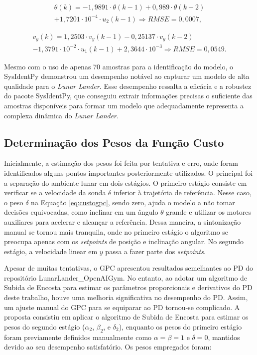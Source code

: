 \documentclass[12pt,           %
a4paper,                       %
openany,                       %
oneside,                       %
chapter=TITLE,                 %
english,                       %
spanish,                       %
brazil,                        %
sumario=tradicional]{abntex2}  %
\begin{document}
\begin{OnehalfSpace}
\begin{equation}
\begin{matrix}
    \theta(k) = -1,9891\cdot \theta(k-1) +0,989\cdot \theta(k-2)\\
    +1,7201\cdot 10^{-4}\cdot u_2(k-1)\Rightarrow RMSE=0,0007,
\end{matrix} 
\end{equation}

\begin{equation}
\begin{matrix}
    v_y(k) = 1,2503\cdot v_y(k-1) - 0,25137\cdot v_y(k-2)\\
    -1,3791\cdot 10^{-2}\cdot u_1(k-1)+2,3644\cdot 10^{-3}\Rightarrow RMSE=0,0549.
\end{matrix} 
\end{equation}

Mesmo com o uso de apenas 70 amostras para a identificação do modelo, o SysIdentPy demonstrou um desempenho notável ao capturar um modelo de alta qualidade para o \textit{Lunar Lander}. Esse desempenho ressalta a eficácia e a robustez do pacote SysIdentPy, que conseguiu extrair informações precisas o suficiente das amostras disponíveis para formar um modelo que adequadamente representa a complexa dinâmica do \textit{Lunar Lander}.

\subsection{Determinação dos Pesos da Função Custo}
\label{subsec:GPCpesos}  

Inicialmente, a estimação dos pesos foi feita por tentativa e erro, onde foram identificados alguns pontos importantes posteriormente utilizados. O principal foi a separação do ambiente lunar em dois estágios. O primeiro estágio consiste em verificar se a velocidade da sonda é inferior à trajetória de referência. Nesse caso, o peso $\delta$ na Equação \ref{eq:custogpc}, sendo zero, ajuda o modelo a não tomar decisões equivocadas, como inclinar em um ângulo $\theta$ grande e utilizar os motores auxiliares para acelerar e alcançar a referência. Dessa maneira, a sintonização manual se tornou mais tranquila, onde no primeiro estágio o algoritmo se preocupa apenas com os \textit{setpoints} de posição e inclinação angular. No segundo estágio, a velocidade linear em $y$ passa a fazer parte dos \textit{setpoints}.

Apesar de muitas tentativas, o GPC apresentou resultados semelhantes ao PD do repositório LunarLander\_OpenAIGym. No entanto, ao adotar um algoritmo de Subida de Encosta para estimar os parâmetros proporcionais e derivativos do PD deste trabalho, houve uma melhoria significativa no desempenho do PD. Assim, um ajuste manual do GPC para se equiparar ao PD tornou-se complicado. A proposta consistiu em aplicar o algoritmo de Subida de Encosta para estimar os pesos do segundo estágio ($\alpha_2$, $\beta_2$, e $\delta_2$), enquanto os pesos do primeiro estágio foram previamente definidos manualmente como $\alpha=\beta=1$ e $\delta=0$, mantidos devido ao seu desempenho satisfatório. Os pesos empregados foram:


\end{OnehalfSpace}
\end{document}
